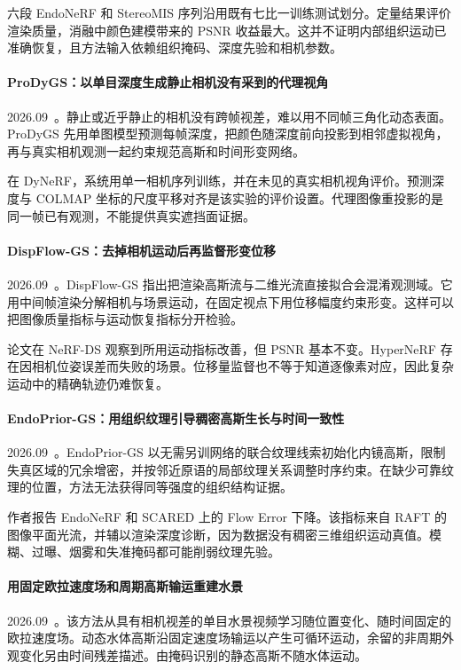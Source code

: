 六段 EndoNeRF 和 StereoMIS 序列沿用既有七比一训练测试划分。定量结果评价渲染质量，消融中颜色建模带来的 PSNR 收益最大。这并不证明内部组织运动已准确恢复，且方法输入依赖组织掩码、深度先验和相机参数。

\paragraph{ProDyGS：以单目深度生成静止相机没有采到的代理视角}
2026.09~\cite{2609_32711}。静止或近乎静止的相机没有跨帧视差，难以用不同帧三角化动态表面。ProDyGS 先用单图模型预测每帧深度，把颜色随深度前向投影到相邻虚拟视角，再与真实相机观测一起约束规范高斯和时间形变网络。

在 DyNeRF，系统用单一相机序列训练，并在未见的真实相机视角评价。预测深度与 COLMAP 坐标的尺度平移对齐是该实验的评价设置。代理图像重投影的是同一帧已有观测，不能提供真实遮挡面证据。

\paragraph{DispFlow-GS：去掉相机运动后再监督形变位移}
2026.09~\cite{2609_36940}。DispFlow-GS 指出把渲染高斯流与二维光流直接拟合会混淆观测域。它用中间帧渲染分解相机与场景运动，在固定视点下用位移幅度约束形变。这样可以把图像质量指标与运动恢复指标分开检验。

论文在 NeRF-DS 观察到所用运动指标改善，但 PSNR 基本不变。HyperNeRF 存在因相机位姿误差而失败的场景。位移量监督也不等于知道逐像素对应，因此复杂运动中的精确轨迹仍难恢复。

\paragraph{EndoPrior-GS：用组织纹理引导稠密高斯生长与时间一致性}
2026.09~\cite{2609_37874}。EndoPrior-GS 以无需另训网络的联合纹理线索初始化内镜高斯，限制失真区域的冗余增密，并按邻近原语的局部纹理关系调整时序约束。在缺少可靠纹理的位置，方法无法获得同等强度的组织结构证据。

作者报告 EndoNeRF 和 SCARED 上的 Flow Error 下降。该指标来自 RAFT 的图像平面光流，并辅以渲染深度诊断，因为数据没有稠密三维组织运动真值。模糊、过曝、烟雾和失准掩码都可能削弱纹理先验。

\paragraph{用固定欧拉速度场和周期高斯输运重建水景}
2026.09~\cite{2609_38622}。该方法从具有相机视差的单目水景视频学习随位置变化、随时间固定的欧拉速度场。动态水体高斯沿固定速度场输运以产生可循环运动，余留的非周期外观变化另由时间残差描述。由掩码识别的静态高斯不随水体运动。


